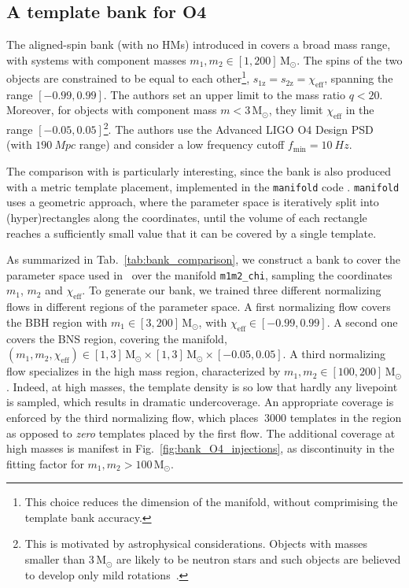 \documentclass[twocolumn,showpacs,preprintnumbers,nofootinbib,prd,
superscriptaddress,10pt]{revtex4-2}
\begin{document}
\subsection{A template bank for O4} \label{sec:all_sky_comparison}

The aligned-spin bank (with no HMs) introduced in \cite{Sakon:2022ibh} covers a broad mass range, with systems with component masses $m_1, m_2 \in [1,200]\,\mathrm{M_\odot}$. The spins of the two objects are constrained to be equal to each other\footnote{This choice reduces the dimension of the manifold, without comprimising the template bank accuracy.}, ${s_\text{1z} = s_\text{2z} = \chi_\text{eff}}$, spanning the range $[-0.99, 0.99]$.
The authors set an upper limit to the mass ratio $q<20$. Moreover, for objects with component mass $m<3\,\mathrm{M_\odot}$, they limit $\chi_\text{eff}$ in the range $[-0.05, 0.05]$\footnote{This is motivated by astrophysical considerations. Objects with masses smaller than $3\,\mathrm{M_\odot}$ are likely to be neutron stars and such objects are believed to develop only mild rotations~\cite{Zhu:2017znf}.}.
The authors use the Advanced LIGO O4 Design PSD (with $\SI{190}{Mpc}$ range) \cite{O4_PSDs} and consider a low frequency cutoff ${f_\text{min} = \SI{10}{Hz}}$.

The comparison with \cite{Sakon:2022ibh} is particularly interesting, since the bank is also produced with a metric template placement, implemented in the \texttt{manifold} code \cite{Hanna:2022zpk}. \texttt{manifold} uses a geometric approach, where the parameter space is iteratively split into (hyper)rectangles along the coordinates, until the volume of each rectangle reaches a sufficiently small value that it can be covered by a single template.

As summarized in Tab.~\ref{tab:bank_comparison}, we construct a bank to cover the parameter space used in~\cite{Sakon:2022ibh} over the manifold \texttt{m1m2\_chi}, sampling the coordinates $m_1$, $m_2$ and $\chi_\text{eff}$.
To generate our bank, we trained three different normalizing flows in different regions of the parameter space. A first normalizing flow covers the BBH region with $m_1 \in [3,200]\,\mathrm{M_\odot}$, with $\chi_\text{eff} \in [-0.99, 0.99]$. A second one covers the BNS region, covering the manifold, ${(m_1, m_2, \chi_\text{eff}) \in [1,3]\,\mathrm{M_\odot}\times[1,3]\,\mathrm{M_\odot}\times [-0.05, 0.05]}$.
A third normalizing flow specializes in the high mass region, characterized by $m_1, m_2 \in [100,200]\,\mathrm{M_\odot}$.
Indeed, at high masses, the template density is so low that hardly any livepoint is sampled, which results in dramatic undercoverage. An appropriate coverage is enforced by the third normalizing flow, which places $~3000$ templates in the region as opposed to {\it zero} templates placed by the first flow.
The additional coverage at high masses is manifest in Fig.~\ref{fig:bank_O4_injections}, as discontinuity in the fitting factor for ${m_1,m_2>100\,\mathrm{M_\odot}}$.
\end{document}
